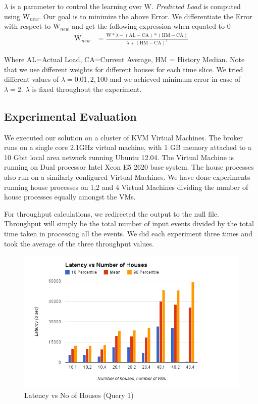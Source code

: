 \noindent $\lambda$ is a parameter to control the learning over W. \textit{Predicted Load} is computed using $\mbox{W}_{new}$.  Our goal is to minimize the above Error. We differentiate the Error with respect to $\mbox{W}_{new}$ and get the following expression when equated to 0-
\begin{align*}
\mbox{W}_{new} &= \frac{\mbox{W}*\lambda-(\mbox{AL}-\mbox{CA}) * (\mbox{HM}-\mbox{CA})}{\lambda + (\mbox{HM}-\mbox{CA})^2}
\end{align*}

\noindent Where AL=Actual Load, CA=Current Average, HM = History Median. Note that we use different weights for different houses for each time slice. We tried different values of $\lambda=0.01, 2, 100$ and we achieved minimum error in case of $\lambda = 2$. $\lambda$ is fixed throughout the experiment.

\subsection{Experimental Evaluation}
We executed our solution on a cluster of KVM \cite{kvm}  Virtual Machines. The broker runs on a single core 2.1GHz virtual machine, with 1 GB memory attached to a 10 Gbit local area network running Ubuntu 12.04. The Virtual Machine is running on Dual processor Intel Xeon E5 2620 base system. The house processes also run on a similarly configured Virtual Machines. We have done experiments running house processes on 1,2 and 4 Virtual Machines dividing the number of house processes equally amongst the VMs.

For throughput calculations, we redirected the output to the null file. Throughput will simply be the total number of input events divided by the total time taken in processing all the events. We did each experiment three times and took the average of the three throughput values.
\begin{figure}[h]
\begin{center}
	\includegraphics[scale=0.6]{img/q1_latency}
	\vspace*{-0.4cm}
	\caption{Latency vs No of Houses (Query 1) \label{fig:q1_latency}}
\end{center}
\end{figure}

